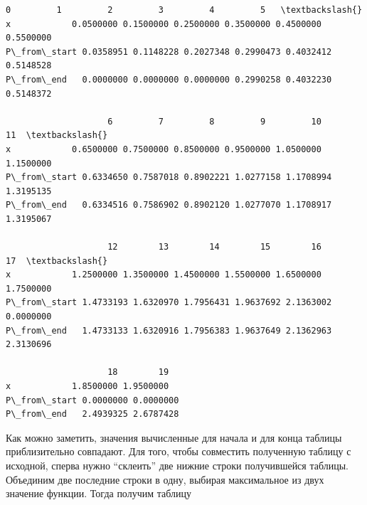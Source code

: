 \documentclass[11pt]{article}
\makeatletter
\newcommand{\boxspacing}{\kern\kvtcb@left@rule\kern\kvtcb@boxsep}
\newcommand{\prompt}[4]{
        {\ttfamily\llap{{\color{#2}[#3]:\hspace{3pt}#4}}\vspace{-\baselineskip}}
    }
\makeatother
\begin{document}
            \begin{tcolorbox}[breakable, size=fbox, boxrule=.5pt, pad at break*=1mm, opacityfill=0]
\prompt{Out}{outcolor}{55}{\boxspacing}
\begin{Verbatim}[commandchars=\\\{\}]
                    0         1         2         3         4         5   \textbackslash{}
x            0.0500000 0.1500000 0.2500000 0.3500000 0.4500000 0.5500000
P\_from\_start 0.0358951 0.1148228 0.2027348 0.2990473 0.4032412 0.5148528
P\_from\_end   0.0000000 0.0000000 0.0000000 0.2990258 0.4032230 0.5148372

                    6         7         8         9         10        11  \textbackslash{}
x            0.6500000 0.7500000 0.8500000 0.9500000 1.0500000 1.1500000
P\_from\_start 0.6334650 0.7587018 0.8902221 1.0277158 1.1708994 1.3195135
P\_from\_end   0.6334516 0.7586902 0.8902120 1.0277070 1.1708917 1.3195067

                    12        13        14        15        16        17  \textbackslash{}
x            1.2500000 1.3500000 1.4500000 1.5500000 1.6500000 1.7500000
P\_from\_start 1.4733193 1.6320970 1.7956431 1.9637692 2.1363002 0.0000000
P\_from\_end   1.4733133 1.6320916 1.7956383 1.9637649 2.1362963 2.3130696

                    18        19
x            1.8500000 1.9500000
P\_from\_start 0.0000000 0.0000000
P\_from\_end   2.4939325 2.6787428
\end{Verbatim}
\end{tcolorbox}
        
    Как можно заметить, значения вычисленные для начала и для конца таблицы
приблизительно совпадают. Для того, чтобы совместить полученную таблицу
с исходной, сперва нужно ``склеить'' две нижние строки получившейся
таблицы. Объединим две последние строки в одну, выбирая максимальное из
двух значение функции. Тогда получим таблицу
\end{document}
